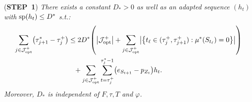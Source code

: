 \documentclass[preprint,cleveref,12pt]{colt2025}
\DeclarePairedDelimiter{\braces}{\{}{\}}	%
\DeclarePairedDelimiter{\parens}{(}{)}	%
\DeclarePairedDelimiter{\abs}{\lvert}{\rvert}	%
\newcommand{\vecspan}[1]{\mathrm{sp}\parens{#1}}
\def\STEP#1{(\strong{STEP~#1})}
\newcommand{\strong}[1]{\textbf{#1}}
\begin{document}
    \bigskip
    \noindent
    \STEP{1}
    \textit{
        There exists a constant $D_* > 0$ as well as an adapted sequence $(h_t)$ with $\vecspan{h_t} \le D^*$ s.t.:
        \begin{equation*}
        \begin{aligned}
            \sum_{j \in \mathcal{J}^+_\mathrm{opt}} \parens*{\tau_{j+1}^* - \tau_j^+}
            & \le
            2 D^* \parens*{
                \abs*{\mathcal{J}^+_\mathrm{opt}}
                + \sum_{j \in \mathcal{J}^+_\mathrm{opt}} \abs*{\braces*{
                    t_\ell \in (\tau_j^+, \tau_{j+1}^+) : \mu^*(S_{t_\ell} ) = 0
                }}
            }
            \\
            & \phantom{\le} 
            + \sum_{j \in \mathcal{J}^+_\mathrm{opt}} \sum_{t=\tau_j^+}^{\tau_j^*-1} \parens*{e_{S_{t+1}} - p_{Z_t}} h_t
            .
        \end{aligned}
        \end{equation*}
        Moreover, $D_*$ is independent of $F, \tau, T$ and $\varphi$. 
    }
    \medskip
\end{document}
